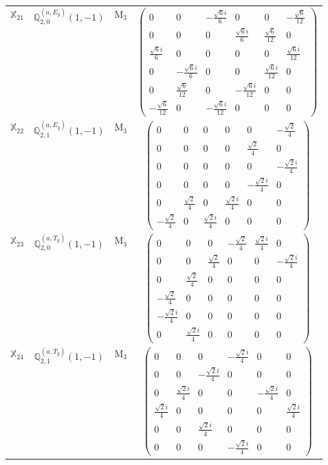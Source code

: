 \documentclass[fleqn,10pt,landscape]{article}
\begin{document}
\begin{itemize}
\begin{center}
\begin{longtable}{c|c|c|c}
$ \mathbb{X}_{21} $ & $\mathbb{Q}_{2,0}^{(a,E_{g})}(1,-1)$ & M$_{3}$ & $\begin{pmatrix} 0 & 0 & - \frac{\sqrt{6} i}{6} & 0 & 0 & - \frac{\sqrt{6}}{12} \\ 0 & 0 & 0 & \frac{\sqrt{6} i}{6} & \frac{\sqrt{6}}{12} & 0 \\ \frac{\sqrt{6} i}{6} & 0 & 0 & 0 & 0 & \frac{\sqrt{6} i}{12} \\ 0 & - \frac{\sqrt{6} i}{6} & 0 & 0 & \frac{\sqrt{6} i}{12} & 0 \\ 0 & \frac{\sqrt{6}}{12} & 0 & - \frac{\sqrt{6} i}{12} & 0 & 0 \\ - \frac{\sqrt{6}}{12} & 0 & - \frac{\sqrt{6} i}{12} & 0 & 0 & 0 \end{pmatrix}$ \\
$ \mathbb{X}_{22} $ & $\mathbb{Q}_{2,1}^{(a,E_{g})}(1,-1)$ & M$_{3}$ & $\begin{pmatrix} 0 & 0 & 0 & 0 & 0 & - \frac{\sqrt{2}}{4} \\ 0 & 0 & 0 & 0 & \frac{\sqrt{2}}{4} & 0 \\ 0 & 0 & 0 & 0 & 0 & - \frac{\sqrt{2} i}{4} \\ 0 & 0 & 0 & 0 & - \frac{\sqrt{2} i}{4} & 0 \\ 0 & \frac{\sqrt{2}}{4} & 0 & \frac{\sqrt{2} i}{4} & 0 & 0 \\ - \frac{\sqrt{2}}{4} & 0 & \frac{\sqrt{2} i}{4} & 0 & 0 & 0 \end{pmatrix}$ \\
$ \mathbb{X}_{23} $ & $\mathbb{Q}_{2,0}^{(a,T_{g})}(1,-1)$ & M$_{3}$ & $\begin{pmatrix} 0 & 0 & 0 & - \frac{\sqrt{2}}{4} & \frac{\sqrt{2} i}{4} & 0 \\ 0 & 0 & \frac{\sqrt{2}}{4} & 0 & 0 & - \frac{\sqrt{2} i}{4} \\ 0 & \frac{\sqrt{2}}{4} & 0 & 0 & 0 & 0 \\ - \frac{\sqrt{2}}{4} & 0 & 0 & 0 & 0 & 0 \\ - \frac{\sqrt{2} i}{4} & 0 & 0 & 0 & 0 & 0 \\ 0 & \frac{\sqrt{2} i}{4} & 0 & 0 & 0 & 0 \end{pmatrix}$ \\
$ \mathbb{X}_{24} $ & $\mathbb{Q}_{2,1}^{(a,T_{g})}(1,-1)$ & M$_{3}$ & $\begin{pmatrix} 0 & 0 & 0 & - \frac{\sqrt{2} i}{4} & 0 & 0 \\ 0 & 0 & - \frac{\sqrt{2} i}{4} & 0 & 0 & 0 \\ 0 & \frac{\sqrt{2} i}{4} & 0 & 0 & - \frac{\sqrt{2} i}{4} & 0 \\ \frac{\sqrt{2} i}{4} & 0 & 0 & 0 & 0 & \frac{\sqrt{2} i}{4} \\ 0 & 0 & \frac{\sqrt{2} i}{4} & 0 & 0 & 0 \\ 0 & 0 & 0 & - \frac{\sqrt{2} i}{4} & 0 & 0 \end{pmatrix}$ \\

\end{longtable}
\end{center}
\end{itemize}
\end{document}

